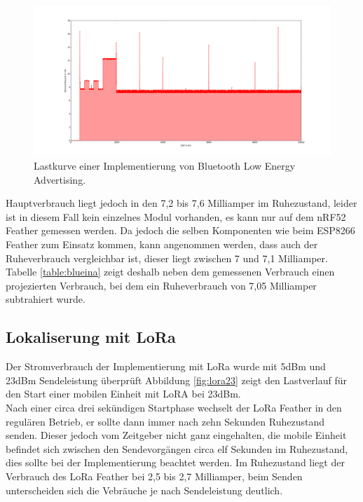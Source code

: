 \begin{figure}[h!]
  \centering
	\includegraphics[width=\textwidth]{plots/blue.png}
  \caption{Lastkurve einer Implementierung von Bluetooth Low Energy Advertising.}
  \label{fig:blue}
\end{figure}

Hauptverbrauch liegt jedoch in den 7,2 bis 7,6 Milliamper im Ruhezustand, leider ist in diesem Fall kein einzelnes Modul vorhanden, es kann nur auf dem nRF52 Feather gemessen werden.
Da jedoch die selben Komponenten wie beim ESP8266 Feather zum Einsatz kommen, kann angenommen werden, dass auch der Ruheverbrauch vergleichbar ist, dieser liegt zwischen 7 und 7,1 Milliamper.
Tabelle \ref{table:blueina} zeigt deshalb neben dem gemessenen Verbrauch einen projezierten Verbrauch, bei dem ein Ruheverbrauch von 7,05 Milliamper subtrahiert wurde.

\subsection{Lokaliserung mit LoRa}
Der Stromverbrauch der Implementierung mit LoRa wurde mit 5dBm und 23dBm Sendeleistung überprüft
Abbildung \ref{fig:lora23} zeigt den Lastverlauf für den Start einer mobilen Einheit mit LoRA bei 23dBm.\\
Nach einer circa drei sekündigen Startphase wechselt der LoRa Feather in den regulären Betrieb, er sollte dann immer nach zehn Sekunden Ruhezustand senden.
Dieser jedoch vom Zeitgeber nicht ganz eingehalten, die mobile Einheit befindet sich zwischen den Sendevorgängen circa elf Sekunden im Ruhezustand, dies sollte bei der Implementierung beachtet werden.
Im Ruhezustand liegt der Verbrauch des LoRa Feather bei 2,5 bis 2,7 Milliamper, beim Senden unterscheiden sich die Vebräuche je nach Sendeleistung deutlich.\\

